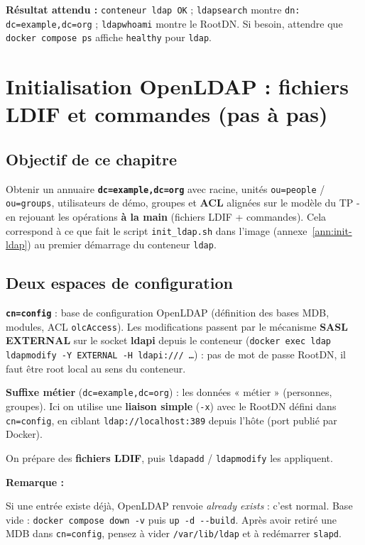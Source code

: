 \documentclass[11pt,a4paper]{report}
\newcommand{\bash}[1]{\lstinline[style=bashstyle, basicstyle=\ttfamily]{#1}}
\newenvironment{nota}{%
  \par\medskip\noindent
  \begin{lrbox}{\notabox}%
  \begin{minipage}{0.97\linewidth}%
  \small
  \textbf{Remarque :}~%
}{%
  \end{minipage}%
  \end{lrbox}%
  {\setlength{\fboxsep}{6pt}%
   \fcolorbox{black!15}{black!3}{\usebox{\notabox}}}%
  \par\medskip
}
\begin{document}
\textbf{Résultat attendu :} \texttt{conteneur ldap OK} ; \texttt{ldapsearch} montre \texttt{dn: dc=example,dc=org} ; \texttt{ldapwhoami} montre le RootDN. Si besoin, attendre que \bash{docker compose ps} affiche \texttt{healthy} pour \texttt{ldap}.

\chapter{Initialisation OpenLDAP : fichiers LDIF et commandes (pas à pas)}\label{chap:init-ldif}

\section{Objectif de ce chapitre}

Obtenir un annuaire \textbf{\texttt{dc=example,dc=org}} avec racine, unités \texttt{ou=people} / \texttt{ou=groups}, utilisateurs de démo, groupes et \textbf{ACL} alignées sur le modèle du TP - en rejouant les opérations \textbf{à la main} (fichiers LDIF + commandes). Cela correspond à ce que fait le script \texttt{init\_ldap.sh} dans l'image (annexe~\ref{ann:init-ldap}) au premier démarrage du conteneur \texttt{ldap}.

\section{Deux espaces de configuration}

\textbf{\texttt{cn=config}} : base de configuration OpenLDAP (définition des bases MDB, modules, ACL \texttt{olcAccess}). Les modifications passent par le mécanisme \textbf{SASL EXTERNAL} sur le socket \textbf{ldapi} depuis le conteneur (\texttt{docker exec ldap ldapmodify -Y EXTERNAL -H ldapi:/// \dots}) : pas de mot de passe RootDN, il faut être root local au sens du conteneur.

\textbf{Suffixe métier} (\texttt{dc=example,dc=org}) : les données « métier » (personnes, groupes). Ici on utilise une \textbf{liaison simple} (\texttt{-x}) avec le RootDN défini dans \texttt{cn=config}, en ciblant \texttt{ldap://localhost:389} depuis l'hôte (port publié par Docker).

On prépare des \textbf{fichiers LDIF}, puis \texttt{ldapadd} / \texttt{ldapmodify} les appliquent.

\begin{nota}
Si une entrée existe déjà, OpenLDAP renvoie \emph{already exists} : c'est normal. Base vide : \bash{docker compose down -v} puis \bash{up -d --build}. Après avoir retiré une MDB dans \texttt{cn=config}, pensez à vider \texttt{/var/lib/ldap} et à redémarrer \texttt{slapd}.
\end{nota}
\end{document}
